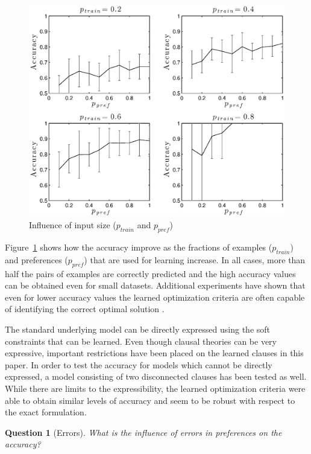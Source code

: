 \documentclass[letterpaper]{article}
\newtheorem{question}{Question}
\theoremstyle{definition}
\begin{document}
\begin{figure}
  \centering
    \includegraphics[width=1\linewidth]{accuracy}
  \caption{Influence of input size ($p_{train}$ and $p_{pref}$)}
  \label{fig:fractie}
\end{figure}

Figure~\ref{fig:fractie} shows how the accuracy improve as the fractions of examples ($p_{train}$) and preferences ($p_{pref}$) that are used for learning increase.
In all cases, more than half the pairs of examples are correctly predicted and the high accuracy values can be obtained even for small datasets.
Additional experiments have shown that even for lower accuracy values the learned optimization criteria are often capable of identifying the correct optimal solution \cite{kolb2015thesis}.

The standard underlying model can be directly expressed using the soft constraints that can be learned.
Even though clausal theories can be very expressive, important restrictions have been placed on the learned clauses in this paper.
In order to test the accuracy for models which cannot be directly expressed, a model consisting of two disconnected clauses has been tested as well.
While there are limits to the expressibility, the learned optimization criteria were able to obtain similar levels of accuracy and seem to be robust with respect to the exact formulation.

\begin{question}[Errors]
  What is the influence of errors in preferences on the accuracy?
\end{question}
\end{document}
